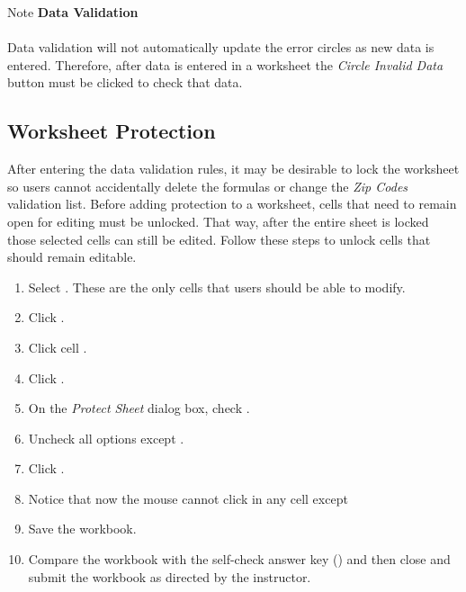 \begin{center}
	\begin{infobox}{Note}
		\textbf{Data Validation}
		\\
		\\
		Data validation will not automatically update the error circles as new data is entered. Therefore, after data is entered in a worksheet the \textit{Circle Invalid Data} button must be clicked to check that data.
	\end{infobox}
\end{center}

\subsection{Worksheet Protection}

After entering the data validation rules, it may be desirable to lock the  worksheet so users cannot accidentally delete the formulas or change the \textit{Zip Codes} validation list. Before adding protection to a worksheet, cells that need to remain open for editing must be unlocked. That way, after the entire sheet is locked those selected cells can still be edited. Follow these steps to unlock cells that should remain editable.

\begin{enumbox}
	\begin{enumerate}
		\item Select . These are the only cells that users should be able to modify.
		\item Click .
		\item Click cell .
		\item Click .
		\item On the \textit{Protect Sheet} dialog box, check .
		\item Uncheck all options except .
		\item Click .
		\item Notice that now the mouse cannot click in any cell except 
		\item Save the  workbook.
		\item Compare the workbook with the self-check answer key () and then close and submit the  workbook as directed by the instructor.
	\end{enumerate}
\end{enumbox}
	

